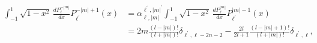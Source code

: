 \begin{align}
    \int_{-1}^{1} \sqrt{1-x^2} \,\frac{dP_{\ell}^{-|m|}}{dx} P_{\ell^{\prime}}^{-|m|+1} (x) &= \alpha_{\ell,|m|}^{\ell^{\prime},|m|^{\prime}}\int_{-1}^{1} \sqrt{1-x^2} \,\frac{dP_{\ell}^{|m|}}{dx} P_{\ell^{\prime}}^{|m|-1} (x) \nonumber\\
     &= 2m\frac{(l-|m|)!}{(l+|m|)!}\delta_{\ell^{\prime},\ell-2n-2} -\frac{2l}{2l+1}\frac{(l-|m|+1)!}{(l+|m|)!}\delta_{\ell^{\prime},\ell},\\

\end{align}
